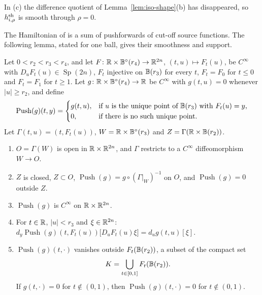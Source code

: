 In (c) the difference quotient of Lemma~\ref{lem:iso-shape}(b) has disappeared, so $h^{\rm sh}_{i,\rho}$ is smooth through
$\rho=0$.

The Hamiltonian of  is a sum of pushforwards of cut-off source functions. The following lemma, stated for one
ball, gives their smoothness and support.

\begin{lemma}\label{lem:iso-pushforward}
Let $0<r_2<r_3<r_4$, and let $F\colon\mathbb{R}\times\mathbb{B}^\circ(r_4)\to\mathbb{R}^{2n}$, $(t,u)\mapsto F_t(u)$, be $C^\infty$ with
$D_uF_t(u)\in\operatorname{Sp}(2n)$, $F_t$ injective on $\mathbb{B}(r_3)$ for every $t$, $F_t=F_0$ for $t\le0$ and $F_t=F_1$ for $t\ge1$.
Let $g\colon\mathbb{R}\times\mathbb{B}^\circ(r_4)\to\mathbb{R}$ be $C^\infty$ with $g(t,u)=0$ whenever $|u|\ge r_2$, and define
\[
 \operatorname{Push}(g)(t,y)=\begin{cases}g(t,u),&\text{if $u$ is the unique point of $\mathbb{B}(r_3)$ with $F_t(u)=y$,}\\
 0,&\text{if there is no such unique point.}\end{cases}
\]
Let $\Gamma(t,u)=(t,F_t(u))$, $W=\mathbb{R}\times\mathbb{B}^\circ(r_3)$ and $Z=\Gamma(\mathbb{R}\times\mathbb{B}(r_2))$.
\begin{enumerate}[label=(\alph*)]
\item $O=\Gamma(W)$ is open in $\mathbb{R}\times\mathbb{R}^{2n}$, and $\Gamma$ restricts to a $C^\infty$ diffeomorphism $W\to O$.
\item $Z$ is closed, $Z\subset O$, $\operatorname{Push}(g)=g\circ(\Gamma|_W)^{-1}$ on $O$, and $\operatorname{Push}(g)=0$ outside $Z$.
\item $\operatorname{Push}(g)$ is $C^\infty$ on $\mathbb{R}\times\mathbb{R}^{2n}$.
\item For $t\in\mathbb{R}$, $|u|<r_3$ and $\xi\in\mathbb{R}^{2n}$:
 $d_y\operatorname{Push}(g)(t,F_t(u))\big[D_uF_t(u)\xi\big]=d_ug(t,u)[\xi]$.
\item $\operatorname{Push}(g)(t,\cdot)$ vanishes outside $F_t(\mathbb{B}(r_2))$, a subset of the compact set
 \[
  K=\bigcup_{t\in[0,1]}F_t(\mathbb{B}(r_2)).
 \]
 If $g(t,\cdot)=0$ for $t\notin(0,1)$, then $\operatorname{Push}(g)(t,\cdot)=0$ for
 $t\notin(0,1)$.
\end{enumerate}
\end{lemma}

